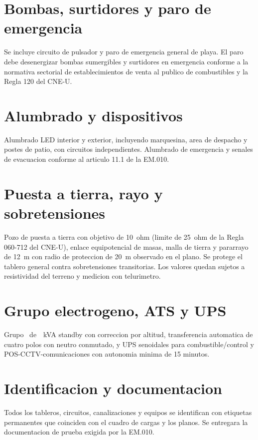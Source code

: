 \section{Bombas, surtidores y paro de emergencia}
Se incluye circuito de pulsador y paro de emergencia general de playa. El
paro debe desenergizar bombas sumergibles y surtidores en emergencia conforme
a la normativa sectorial de establecimientos de venta al publico de
combustibles y la Regla 120 del CNE-U.

\section{Alumbrado y dispositivos}
Alumbrado LED interior y exterior, incluyendo marquesina, area de despacho y
postes de patio, con circuitos independientes. Alumbrado de emergencia y
senales de evacuacion conforme al articulo 11.1 de la EM.010.

\section{Puesta a tierra, rayo y sobretensiones}
Pozo de puesta a tierra con objetivo de 10~ohm (limite de 25~ohm de la Regla
060-712 del CNE-U), enlace equipotencial de masas, malla de tierra y pararrayo
de 12~m con radio de proteccion de 20~m observado en el plano. Se protege el
tablero general contra sobretensiones transitorias. Los valores quedan sujetos
a resistividad del terreno y medicion con telurimetro.

\section{Grupo electrogeno, ATS y UPS}
Grupo \GrupoModelo~de~\GrupoNom~kVA standby con correccion por altitud,
transferencia automatica de cuatro polos con neutro conmutado, y UPS
senoidales para combustible/control y POS-CCTV-comunicaciones con autonomia
minima de 15 minutos.

\section{Identificacion y documentacion}
Todos los tableros, circuitos, canalizaciones y equipos se identifican con
etiquetas permanentes que coinciden con el cuadro de cargas y los planos. Se
entregara la documentacion de prueba exigida por la EM.010.
